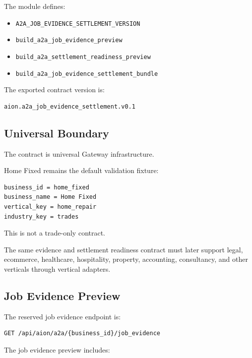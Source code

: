 The module defines:

\begin{itemize}
  \item \texttt{A2A\_JOB\_EVIDENCE\_SETTLEMENT\_VERSION}
  \item \texttt{build\_a2a\_job\_evidence\_preview}
  \item \texttt{build\_a2a\_settlement\_readiness\_preview}
  \item \texttt{build\_a2a\_job\_evidence\_settlement\_bundle}
\end{itemize}

The exported contract version is:

\begin{verbatim}
aion.a2a_job_evidence_settlement.v0.1
\end{verbatim}

\subsection{Universal Boundary}

The contract is universal Gateway infrastructure.

Home Fixed remains the default validation fixture:

\begin{verbatim}
business_id = home_fixed
business_name = Home Fixed
vertical_key = home_repair
industry_key = trades
\end{verbatim}

This is not a trade-only contract.

The same evidence and settlement readiness contract must later support legal, ecommerce, healthcare, hospitality, property, accounting, consultancy, and other verticals through vertical adapters.

\subsection{Job Evidence Preview}

The reserved job evidence endpoint is:

\begin{verbatim}
GET /api/aion/a2a/{business_id}/job_evidence
\end{verbatim}

The job evidence preview includes:

